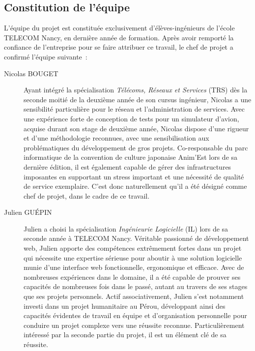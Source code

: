 \subsection{Constitution de l'équipe}

L'équipe du projet est constituée exclusivement d'élèves-ingénieurs de l'école TELECOM Nancy, en dernière année de formation. Après avoir remporté la confiance de l'entreprise pour se faire attribuer ce travail, le chef de projet a confirmé l'équipe suivante~:

\begin{description}
\item[Nicolas BOUGET] Ayant intégré la spécialisation \textit{Télécoms, Réseaux et Services} (TRS) dès la seconde moitié de la deuxième année de son cursus ingénieur, Nicolas a une sensibilité particulière pour le réseau et l'administration de services. Avec une expérience forte de conception de tests pour un simulateur d'avion, acquise durant son stage de deuxième année, Nicolas dispose d'une rigueur et d'une méthodologie reconnues, avec une sensibilisation aux problématiques du développement de gros projets. Co-responsable du parc informatique de la convention de culture japonaise Anim'Est lors de sa dernière édition, il est également capable de gérer des infrastructures imposantes en supportant un stress important et une nécessité de qualité de service exemplaire. C'est donc naturellement qu'il a été désigné comme chef de projet, dans le cadre de ce travail.\\
\item[Julien GUÉPIN] Julien a choisi la spécialisation \textit{Ingénieurie Logicielle} (IL) lors de sa seconde année à TELECOM Nancy. Véritable passionné de développement web, Julien apporte des compétences extrêmement fortes dans un projet qui nécessite une expertise sérieuse pour aboutir à une solution logicielle munie d'une interface web fonctionnelle, ergonomique et efficace. Avec de nombreuses expériences dans le domaine, il a été capable de prouver ses capacités de nombreuses fois dans le passé, autant au travers de ses stages que ses projets personnels. Actif associativement, Julien s'est notamment investi dans un projet humanitaire au Pérou, développant ainsi des capacités évidentes de travail en équipe et d'organisation personnelle pour conduire un projet complexe vers une réussite reconnue. Particulièrement intéressé par la seconde partie du projet, il est un élément clé de sa réussite.\\

\end{description}
